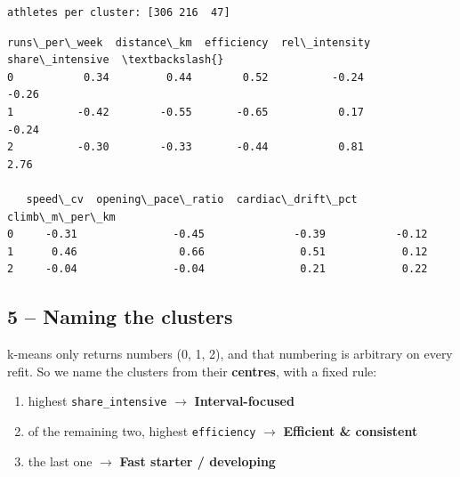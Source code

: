 \documentclass[11pt]{article}
\makeatletter
\providecommand{\tightlist}{%
      \setlength{\itemsep}{0pt}\setlength{\parskip}{0pt}}
\newcommand{\boxspacing}{\kern\kvtcb@left@rule\kern\kvtcb@boxsep}
\newcommand{\prompt}[4]{
        {\ttfamily\llap{{\color{#2}[#3]:\hspace{3pt}#4}}\vspace{-\baselineskip}}
    }
\makeatother
\begin{document}
    \begin{Verbatim}[commandchars=\\\{\}]
athletes per cluster: [306 216  47]
    \end{Verbatim}

            \begin{tcolorbox}[breakable, size=fbox, boxrule=.5pt, pad at break*=1mm, opacityfill=0]
\prompt{Out}{outcolor}{5}{\boxspacing}
\begin{Verbatim}[commandchars=\\\{\}]
   runs\_per\_week  distance\_km  efficiency  rel\_intensity  share\_intensive  \textbackslash{}
0           0.34         0.44        0.52          -0.24            -0.26
1          -0.42        -0.55       -0.65           0.17            -0.24
2          -0.30        -0.33       -0.44           0.81             2.76

   speed\_cv  opening\_pace\_ratio  cardiac\_drift\_pct  climb\_m\_per\_km
0     -0.31               -0.45              -0.39           -0.12
1      0.46                0.66               0.51            0.12
2     -0.04               -0.04               0.21            0.22
\end{Verbatim}
\end{tcolorbox}
        
    \subsection{5 -- Naming the clusters}\label{naming-the-clusters}

k-means only returns numbers (0, 1, 2), and that numbering is arbitrary
on every refit. So we name the clusters from their \textbf{centres},
with a fixed rule:

\begin{enumerate}
\def\labelenumi{\arabic{enumi}.}
\tightlist
\item
  highest \texttt{share\_intensive} \ensuremath{\rightarrow} \textbf{Interval-focused}
\item
  of the remaining two, highest \texttt{efficiency} \ensuremath{\rightarrow} \textbf{Efficient
  \& consistent}
\item
  the last one \ensuremath{\rightarrow} \textbf{Fast starter / developing}
\end{enumerate}
\end{document}
